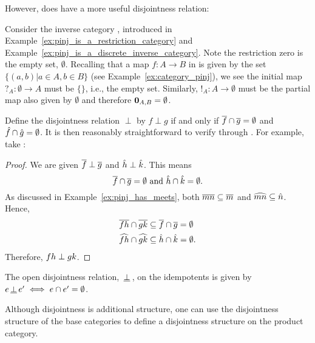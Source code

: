However, \pinj does have a more useful disjointness relation:
\begin{example}\label{ex:pinj_has_a_disjointness_relation}
  Consider the inverse category \pinj, introduced in Example~\ref{ex:pinj_is_a_restriction_category}
  and Example~\ref{ex:pinj_is_a_discrete_inverse_category}.
  Note the restriction zero is the empty set, $\emptyset$. Recalling that a map $f:A\to B$ in \pinj
  is given by the set $\{(a,b)| a\in A, b\in B\}$ (see Example~\ref{ex:category_pinj}), we see the
  initial map $?_A:\emptyset \to A$ must be $\{\}$, i.e., the empty set. Similarly,
  $!_A:A\to\emptyset$ must be the partial map also given by $\emptyset$ and therefore
  $\mathbf{0}_{A,B} = \emptyset$.

  Define the disjointness relation $\perp$ by $f \perp g$ if and only if
  $\overline{f}\cap\overline{g}=\emptyset$ and $\hat{f}\cap\hat{g} = \emptyset$. It is then
  reasonably straightforward to verify  through . For example, take
  :
  \begin{proof}
    We are given $\overline{f}\perp\overline{g}$ and $\hat{h}\perp\hat{k}$. This means
    \[
      \overline{f}\cap\overline{g}=\emptyset \text{ and }\hat{h}\cap\hat{k} = \emptyset.
    \]
    As discussed in Example~\ref{ex:pinj_has_meets}, both
    $\overline{m n} \subseteq \overline{m}$ and  $\widehat{m n} \subseteq \hat{n}$. Hence,
    \begin{align*}
      \overline{f h}\cap\overline{g k}&\subseteq \overline{f}\cap \overline{g}= \emptyset\\
      \widehat{f h}\cap\widehat{g k}&\subseteq \hat{h}\cap \hat{k}= \emptyset.
    \end{align*}
    Therefore, $f h \perp g k$.
  \end{proof}

  The open disjointness relation, $\,\underline{\perp}\,$, on the idempotents is given by
  $e \,\underline{\perp}\, e' \iff e\cap e' = \emptyset$.
\end{example}

Although disjointness is additional structure, one can use the disjointness structure of the base
categories to define a disjointness structure on the product category.

